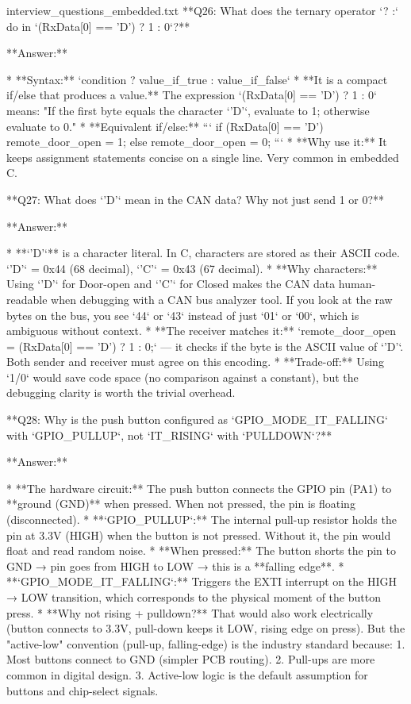 \begin{filecontents*}{interview_questions_embedded.txt}
**Q26: What does the ternary operator `? :` do in `(RxData[0] == 'D') ? 1 : 0`?**

**Answer:**

* **Syntax:** `condition ? value_if_true : value_if_false`
* **It is a compact if/else that produces a value.** The expression `(RxData[0] == 'D') ? 1 : 0` means: "If the first byte equals the character `'D'`, evaluate to 1; otherwise evaluate to 0."
* **Equivalent if/else:**
  ```
  if (RxData[0] == 'D') {
      remote_door_open = 1;
  } else {
      remote_door_open = 0;
  }
  ```
* **Why use it:** It keeps assignment statements concise on a single line. Very common in embedded C.

**Q27: What does `'D'` mean in the CAN data? Why not just send 1 or 0?**

**Answer:**

* **`'D'`** is a character literal. In C, characters are stored as their ASCII code. `'D'` = 0x44 (68 decimal), `'C'` = 0x43 (67 decimal).
* **Why characters:** Using `'D'` for Door-open and `'C'` for Closed makes the CAN data human-readable when debugging with a CAN bus analyzer tool. If you look at the raw bytes on the bus, you see `44` or `43` instead of just `01` or `00`, which is ambiguous without context.
* **The receiver matches it:** `remote_door_open = (RxData[0] == 'D') ? 1 : 0;` — it checks if the byte is the ASCII value of `'D'`. Both sender and receiver must agree on this encoding.
* **Trade-off:** Using `1/0` would save code space (no comparison against a constant), but the debugging clarity is worth the trivial overhead.

**Q28: Why is the push button configured as `GPIO_MODE_IT_FALLING` with `GPIO_PULLUP`, not `IT_RISING` with `PULLDOWN`?**

**Answer:**

* **The hardware circuit:** The push button connects the GPIO pin (PA1) to **ground (GND)** when pressed. When not pressed, the pin is floating (disconnected).
* **`GPIO_PULLUP`:** The internal pull-up resistor holds the pin at 3.3V (HIGH) when the button is not pressed. Without it, the pin would float and read random noise.
* **When pressed:** The button shorts the pin to GND → pin goes from HIGH to LOW → this is a **falling edge**.
* **`GPIO_MODE_IT_FALLING`:** Triggers the EXTI interrupt on the HIGH → LOW transition, which corresponds to the physical moment of the button press.
* **Why not rising + pulldown?** That would also work electrically (button connects to 3.3V, pull-down keeps it LOW, rising edge on press). But the "active-low" convention (pull-up, falling-edge) is the industry standard because:
  1. Most buttons connect to GND (simpler PCB routing).
  2. Pull-ups are more common in digital design.
  3. Active-low logic is the default assumption for buttons and chip-select signals.


\end{filecontents*}

